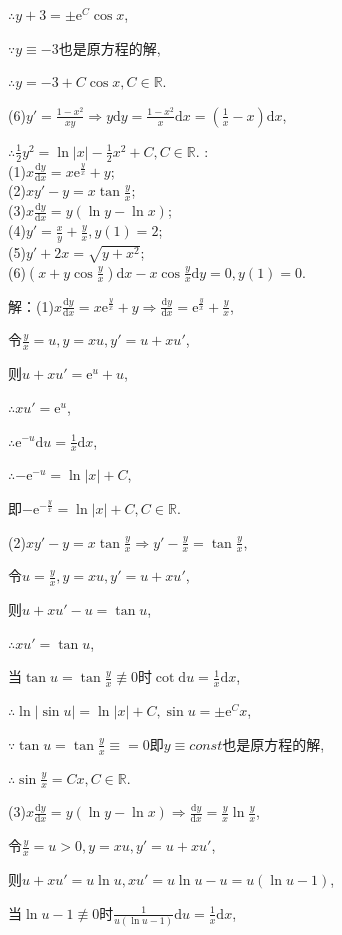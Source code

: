 \documentclass[12pt,UTF8,fleqn]{ctexart}
\newcommand{\md}[1]{\mathrm d#1}
\newcommand{\me}[0]{\mathrm e}
\begin{document}
\begin{enumerate}
$\therefore y+3=\pm\me^C\cos x$,

$\because y\equiv-3$也是原方程的解,

$\therefore y=-3+C\cos x,C\in\mathbb R$.

(6)$y'=\frac{1-x^2}{xy}\Rightarrow y\mathrm dy=\frac{1-x^2}x\mathrm dx=(\frac1x-x)\mathrm dx$,

$\therefore\frac12y^2=\ln|x|-\frac12x^2+C,C\in\mathbb R$.
:\\
(1)$x\frac{\md y}{\md x}=x\me^{\frac yx}+y$;\\
(2)$xy'-y=x\tan\frac yx$;\\
(3)$x\frac{\md y}{\md x}=y(\ln y-\ln x)$;\\
(4)$y'=\frac xy+\frac yx,y(1)=2$;\\
(5)$y'+2x=\sqrt{y+x^2}$;\\
(6)$(x+y\cos\frac yx)\md x-x\cos\frac yx\md y=0,y(1)=0$.

解：(1)$x\frac{\md y}{\md x}=x\me^{\frac yx}+y\Rightarrow\frac{\md y}{\md x}=\me^{\frac yx}+\frac yx$,

令$\frac yx=u, y=xu,y'=u+xu'$,

则$u+xu'=\me^u+u$, 

$\therefore xu'=\me^u$,

$\therefore\me^{-u}\md u=\frac1x\md x$,

$\therefore-\me^{-u}=\ln|x|+C$,

即$-\me^{-\frac yx}=\ln|x|+C,C\in\mathbb R$.

(2)$xy'-y=x\tan\frac yx\Rightarrow y'-\frac yx=\tan\frac yx$,

令$u=\frac yx,y=xu,y'=u+xu'$,

则$u+xu'-u=\tan u$,

$\therefore xu'=\tan u$,

当$\tan u=\tan\frac yx\not\equiv0$时$\cot\md u=\frac1x\md x$,

$\therefore\ln|\sin u|=\ln|x|+C,\sin u=\pm\me^Cx$,

$\because\tan u=\tan\frac yx\equiv=0$即$y\equiv const$也是原方程的解,

$\therefore\sin\frac yx=Cx,C\in\mathbb R$.

(3)$x\frac{\md y}{\md x}=y(\ln y-\ln x)\Rightarrow\frac{\md y}{\md x}=\frac yx\ln\frac yx$,

令$\frac yx=u>0,y=xu,y'=u+xu'$,

则$u+xu'=u\ln u, xu'=u\ln u-u=u(\ln u-1)$,

当$\ln u-1\not\equiv0$时$\frac1{u(\ln u-1)}\md u=\frac1x\md x$,


\end{enumerate}
\end{document}
